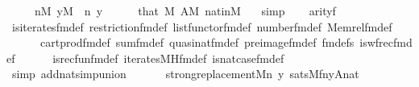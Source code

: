 \begin{isabellebody}
\ \ \ \ \ {\isachardoublequoteopen}n{\isasymin}M{\isachardoublequoteclose}\ {\isachardoublequoteopen}y{\isasymin}M{\isachardoublequoteclose}\ \ n\ y\isanewline
\ \ \ \ \isamarkupfalse%
\ that\ {\isacartoucheopen}{}{\isasymin}M{\isacartoucheclose}\ {\isacartoucheopen}A{\isasymin}M{\isacartoucheclose}\ nat{\isacharunderscore}{\kern0pt}in{\isacharunderscore}{\kern0pt}M\ {}\ \isamarkupfalse%
\ simp\isanewline
\ \ \isamarkupfalse%
\ {\isachardoublequoteopen}arity{\isacharparenleft}{\kern0pt}{\isacharquery}{\kern0pt}f{\isacharparenright}{\kern0pt}\ {\isacharequal}{\kern0pt}\ {}{\isachardoublequoteclose}\isanewline
\ \ \ \ \isamarkupfalse%
\ is{\isacharunderscore}{\kern0pt}iterates{\isacharunderscore}{\kern0pt}fm{\isacharunderscore}{\kern0pt}def\ restriction{\isacharunderscore}{\kern0pt}fm{\isacharunderscore}{\kern0pt}def\ list{\isacharunderscore}{\kern0pt}functor{\isacharunderscore}{\kern0pt}fm{\isacharunderscore}{\kern0pt}def\ number{}{\isacharunderscore}{\kern0pt}fm{\isacharunderscore}{\kern0pt}def\ Memrel{\isacharunderscore}{\kern0pt}fm{\isacharunderscore}{\kern0pt}def\isanewline
\ \ \ \ \ \ cartprod{\isacharunderscore}{\kern0pt}fm{\isacharunderscore}{\kern0pt}def\ sum{\isacharunderscore}{\kern0pt}fm{\isacharunderscore}{\kern0pt}def\ quasinat{\isacharunderscore}{\kern0pt}fm{\isacharunderscore}{\kern0pt}def\ pre{\isacharunderscore}{\kern0pt}image{\isacharunderscore}{\kern0pt}fm{\isacharunderscore}{\kern0pt}def\ fm{\isacharunderscore}{\kern0pt}defs\ is{\isacharunderscore}{\kern0pt}wfrec{\isacharunderscore}{\kern0pt}fm{\isacharunderscore}{\kern0pt}def\isanewline
\ \ \ \ \ \ is{\isacharunderscore}{\kern0pt}recfun{\isacharunderscore}{\kern0pt}fm{\isacharunderscore}{\kern0pt}def\ iterates{\isacharunderscore}{\kern0pt}MH{\isacharunderscore}{\kern0pt}fm{\isacharunderscore}{\kern0pt}def\ is{\isacharunderscore}{\kern0pt}nat{\isacharunderscore}{\kern0pt}case{\isacharunderscore}{\kern0pt}fm{\isacharunderscore}{\kern0pt}def\isanewline
\ \ \ \ \isamarkupfalse%
\ {\isacharparenleft}{\kern0pt}simp\ add{\isacharcolon}{\kern0pt}nat{\isacharunderscore}{\kern0pt}simp{\isacharunderscore}{\kern0pt}union{\isacharparenright}{\kern0pt}\isanewline
\ \ \isamarkupfalse%
\isanewline
\ \ \isamarkupfalse%
\ {\isachardoublequoteopen}strong{\isacharunderscore}{\kern0pt}replacement{\isacharparenleft}{\kern0pt}{\isacharhash}{\kern0pt}{\isacharhash}{\kern0pt}M{\isacharcomma}{\kern0pt}{\isasymlambda}n\ y{\isachardot}{\kern0pt}\ sats{\isacharparenleft}{\kern0pt}M{\isacharcomma}{\kern0pt}{\isacharquery}{\kern0pt}f{\isacharcomma}{\kern0pt}{\isacharbrackleft}{\kern0pt}n{\isacharcomma}{\kern0pt}y{\isacharcomma}{\kern0pt}A{\isacharcomma}{\kern0pt}{}{\isacharcomma}{\kern0pt}nat{\isacharbrackright}{\kern0pt}{\isacharparenright}{\kern0pt}{\isacharparenright}{\kern0pt}{\isachardoublequoteclose}\isanewline

\end{isabellebody}
